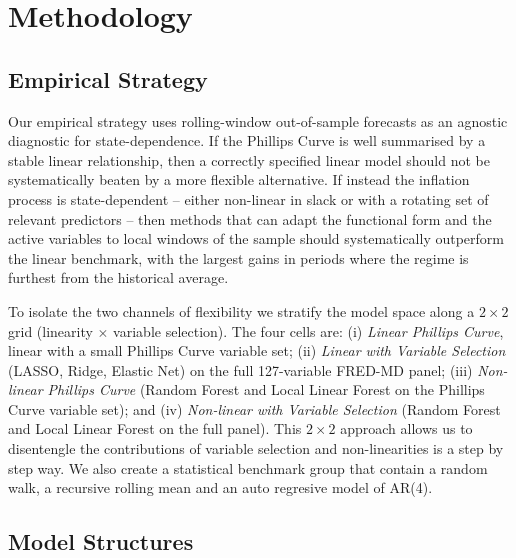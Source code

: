 \documentclass[12pt,a4paper]{article}
\begin{document}
\FloatBarrier
\section{Methodology}
\label{sec:methodology}

\subsection{Empirical Strategy}
\label{subsec:strategy}

Our empirical strategy uses rolling-window out-of-sample forecasts as an agnostic diagnostic for state-dependence. If the Phillips Curve is well summarised by a stable linear relationship, then a correctly specified linear model should not be systematically beaten by a more flexible alternative. If instead the inflation process is state-dependent -- either non-linear in slack or with a rotating set of relevant predictors -- then methods that can adapt the functional form and the active variables to local windows of the sample should systematically outperform the linear benchmark, with the largest gains in periods where the regime is furthest from the historical average.

To isolate the two channels of flexibility we stratify the model space along a $2 \times 2$ grid (linearity $\times$ variable selection). The four cells are: (i) \emph{Linear Phillips Curve}, linear with a small Phillips Curve variable set; (ii) \emph{Linear with Variable Selection} (LASSO, Ridge, Elastic Net) on the full 127-variable FRED-MD panel; (iii) \emph{Non-linear Phillips Curve} (Random Forest and Local Linear Forest on the Phillips Curve variable set); and (iv) \emph{Non-linear with Variable Selection} (Random Forest and Local Linear Forest on the full panel). This $2 \times 2$ approach allows us to disentengle the contributions of variable selection and non-linearities is a step by step way. We also create a statistical benchmark group that contain a random walk, a recursive rolling mean and an auto regresive model of AR(4).

\subsection{Model Structures}
\label{subsec:model_str}
\end{document}
